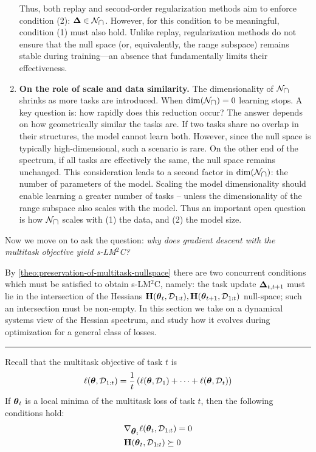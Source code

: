 \documentclass{article} %
\newcommand{\hessian}{\vH}
\newcommand{\lighthline}{\noindent\textcolor{gray!50}{\rule{\linewidth}{0.4pt}}}
\begin{document}
\begin{enumerate}
\begin{enumerate}
    \end{enumerate}
    Thus, both replay and second-order regularization methods aim to enforce condition (2): $\mbox{$\mbox{$\boldsymbol{\Delta}$}$} \in \mathcal{N}_{\mbox{$\cap$}}$. However, for this condition to be meaningful, condition (1) must also hold. Unlike replay, regularization methods do not ensure that the null space (or, equivalently, the range subspace) remains stable during training—an absence that fundamentally limits their effectiveness.
    \item \textbf{On the role of scale and data similarity.} The dimensionality of $\mathcal{N}_{\mbox{$\cap$}}$ shrinks as more tasks are introduced. When $\dim(\mathcal{N}_{\mbox{$\cap$}})=0$ learning stops. A key question is: how rapidly does this reduction occur? The answer depends on how geometrically similar the tasks are. If two tasks share no overlap in their structures, the model cannot learn both. However, since the null space is typically high-dimensional, such a scenario is rare. On the other end of the spectrum, if all tasks are effectively the same, the null space remains unchanged. This consideration leads to a second factor in $\dim(\mathcal{N}_{\mbox{$\cap$}})$: the number of parameters of the model. Scaling the model dimensionality should enable learning a greater number of tasks -- unless the dimensionality of the range subspace also scales with the model. Thus an important open question is how $\mathcal{N}_{\mbox{$\cap$}}$ scales with (1) the data, and (2) the model size. 
\end{enumerate}


Now we move on to ask the question: \emph{why does gradient descent with the multitask objective yield s-LM$^2$C?}

By \cref{theo:preservation-of-multitask-nullspace} there are two concurrent conditions which must be satisfied to obtain s-LM$^2$C, namely: the task update $\mbox{$\mbox{$\boldsymbol{\Delta}$}$}_{t,t+1}$ must lie in the intersection of the Hessians $\hessian(\vparam_t, \data_{1:t}),\hessian(\vparam_{t+1}, \data_{1:t})$ null-space; such an intersection must be non-empty. In this section we take on a dynamical systems view of the Hessian spectrum, and study how it evolves during optimization for a general class of losses. 

\vspace{0.5cm}



\lighthline


Recall that the multitask objective of task $t$ is
\begin{equation}
    \ell(\mbox{$\mbox{$\boldsymbol{\theta}$}$}, \mbox{${\cal D}$}_{1:t}) = \frac{1}{t} \left(\ell(\mbox{$\mbox{$\boldsymbol{\theta}$}$}, \mbox{${\cal D}$}_1) + \dots + \ell(\mbox{$\mbox{$\boldsymbol{\theta}$}$}, \mbox{${\cal D}$}_t)\right)
\end{equation}
If $\mbox{$\mbox{$\boldsymbol{\theta}$}$}_t$ is a local minima of the multitask loss of task $t$, then the following conditions hold: 
\begin{align}
    \label{eq:opt-condition2}
    &\nabla_{\vparam_t}\loss(\vparam_t, \data_{1:t}) = 0\\
    \label{eq:opt-condition3}
    &\hessian(\vparam_t, \data_{1:t}) \succeq 0
\end{align}
\end{document}

